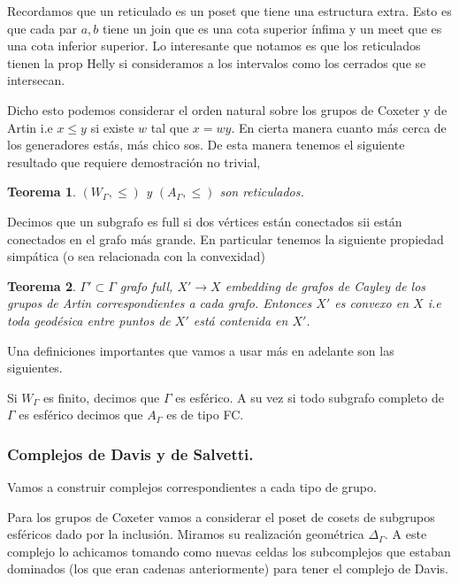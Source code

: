 \documentclass[13pt]{scrartcl}
\theoremstyle{plain} %
\newtheorem{teo}{\color{rojo} Teorema}
\theoremstyle{definition}
\theoremstyle{remark}
\newcommand{\blue}{\textcolor{chulo}}
\begin{document}
	Recordamos que un \blue{reticulado } es un poset que tiene una estructura extra. Esto es que cada par ${a,b}$ tiene un join que es una cota superior ínfima y un meet que es una cota inferior superior. Lo interesante que notamos es que los reticulados tienen la prop Helly si consideramos a los intervalos como los cerrados que se intersecan.
	
	Dicho esto podemos considerar el orden natural sobre los grupos de Coxeter y de Artin i.e $x \le y$ si existe $w$ tal que $x = wy$. En cierta manera cuanto más cerca de los generadores estás, más chico sos. De esta manera tenemos el siguiente resultado que requiere demostración no trivial,
	
	\begin{teo}
		$(W_\Gamma, \le)$ y $(A_\Gamma, \le)$ son reticulados.
	\end{teo}
	
	Decimos que un subgrafo es \blue{full} si dos vértices están conectados sii están conectados en el grafo más grande. En particular tenemos la siguiente propiedad simpática (o sea relacionada con la convexidad)
	
	\begin{teo}
		$\Gamma' \subset \Gamma$ grafo full, $X' \to X$ embedding de grafos de Cayley de los grupos de Artin correspondientes a cada grafo. Entonces $X'$ es convexo en $X$ i.e toda geodésica entre puntos de $X'$ está contenida en $X'$.
	\end{teo}
	
	Una definiciones importantes que vamos a usar más en adelante son las siguientes. 
	
	Si $W_\Gamma$ es finito, decimos que $\Gamma$ es \blue{esférico}. A su vez si todo subgrafo completo de $\Gamma$ es esférico decimos que $A_\Gamma$ es de tipo \blue{FC}.
	
	
	\subsubsection{Complejos de Davis y de Salvetti.}
	
	Vamos a construir complejos correspondientes a cada tipo de grupo.
	
	Para los grupos de Coxeter vamos a considerar el poset de cosets de subgrupos esféricos dado por la inclusión. Miramos su realización geométrica $\Delta_\Gamma$. A este complejo lo achicamos tomando como nuevas celdas los subcomplejos que estaban dominados (los que eran cadenas anteriormente) para tener el \blue{complejo de Davis}. 
	
\end{document}
